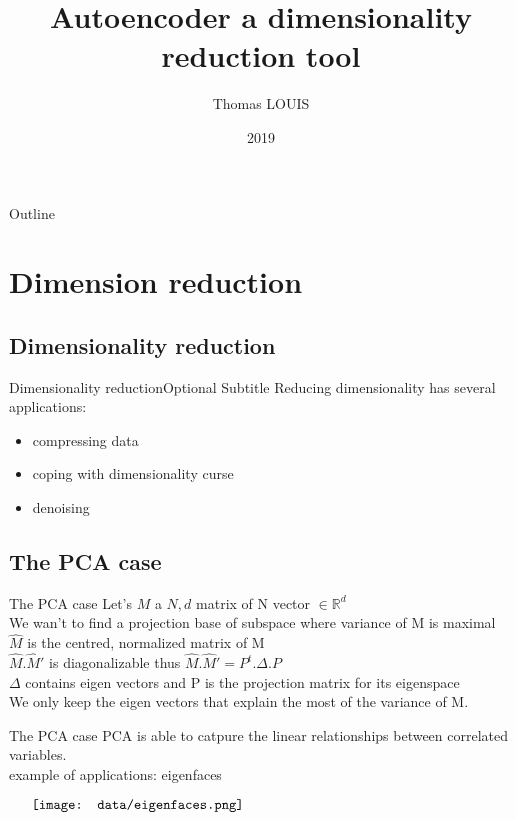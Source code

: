 \documentclass{beamer}
\title{Autoencoder a dimensionality reduction tool}
\author{Thomas LOUIS}
\date{2019}
\newcommand{\reels}{\mathbb{R}}
\begin{document}
\begin{frame}
  \titlepage
\end{frame}

\begin{frame}{Outline}
  \tableofcontents
\end{frame}

\section{Dimension reduction}

\subsection{Dimensionality reduction}

\begin{frame}{Dimensionality reduction}{Optional Subtitle}
    Reducing dimensionality has several applications:
    \begin{itemize}
	    \item compressing data
	    \item coping with dimensionality curse
            \item denoising
    \end{itemize}
\end{frame}

\subsection{The PCA case}
\begin{frame}{The PCA case}
    Let's $M$ a ${N, d}$ matrix  of N vector $\in \reels^{d}$\\
    We wan't to find a projection base of subspace where variance of M is maximal \\
    $\hat{M}$ is the centred, normalized matrix of M \\
    $\hat{M}.\hat{M}'$ is diagonalizable thus $\hat{M}.\hat{M}' = P^{t}.\Delta.P$ \\
    $\Delta$ contains eigen vectors and P is the projection matrix for its eigenspace \\
    We only keep the eigen vectors that explain the most of the variance of M. \\
\end{frame}

\begin{frame}{The PCA case}
    PCA is able to catpure the linear relationships between correlated variables. \\
    example of applications: eigenfaces \\
    \begin{minipage}{6in}
    \centering
    $\vcenter{
    \texttt{[image: data/eigenfaces.png]}
    }$
    \end{minipage}
\end{frame}
\end{document}
